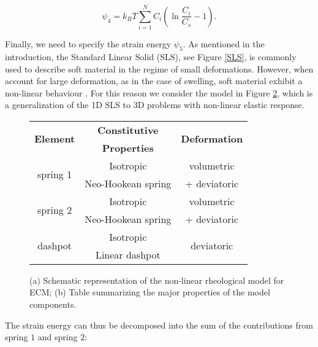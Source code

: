 \begin{equation}
\psi_4 = k_B T \sum\limits_{i=1}^{N} C_i \left(\ln \frac{C_i}{ C_s}-1\right).
\end{equation}

Finally, we need to specify the strain energy $\psi_5$. As mentioned in the introduction, the Standard Linear Solid (SLS), see Figure \ref{SLS}, is commonly used to describe soft material in the regime of small deformations. However, when account for large deformation, as in the case of swelling, soft material exhibit a non-linear behaviour \cite{floryprinciples}. For this reason we consider the model in Figure \ref{fig1A}, which is a generalization of the 1D SLS to 3D problems with non-linear elastic response. 

\begin{figure}
	\begin{subfigure}{0.32\textwidth}
		\centering
		\large
		\def\svgwidth{0.9\linewidth}
		
		\caption{}
		\label{fig1A}
	\end{subfigure}
	\hspace{20mm}
	\begin{subtable}{0.375\textwidth}
		\hspace{-15mm}
		\begin{tabular}{|c | c | c|}	
			\hline
			\multirow{2}{*}{\textbf{ Element } }& \textbf{ Constitutive } & \multirow{2}{*}{\textbf{ Deformation }} \\
			& \textbf{Properties} &\\
			\hline	
			\multirow{2}{*}{ spring 1 } & Isotropic  & volumetric\\
			&Neo-Hookean spring& + deviatoric\\
			\hline
			\multirow{2}{*}{ spring 2 } & Isotropic  & volumetric\\
			&Neo-Hookean spring &+ deviatoric\\ 
			\hline
			\multirow{2}{*}{dashpot}  & Isotropic  & 	\multirow{2}{*}{deviatoric}\\
			& Linear dashpot & \\
			\hline
		\end{tabular}
		\caption{}
	\end{subtable}
	\caption{(a) Schematic representation of the non-linear rheological model for ECM; (b) Table summarizing the major properties of the model components.}
\end{figure}

The strain energy can thus be decomposed into the sum of the contributions from spring $1$ and spring $2$:

